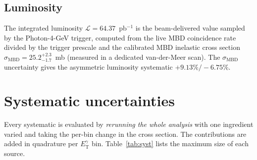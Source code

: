 \documentclass[11pt]{article}
\newcommand{\ETg}{E_{\mathrm{T}}^{\gamma}}
\begin{document}
\subsection{Luminosity}

The integrated luminosity $\mathcal{L}=64.37$~pb$^{-1}$ is the beam-delivered value sampled by the
Photon-4-GeV trigger, computed from the live MBD coincidence rate divided by the trigger prescale
and the calibrated MBD inelastic cross section
$\sigma_{\mathrm{MBD}}=25.2^{+2.3}_{-1.7}$~mb (measured in a dedicated van-der-Meer scan). The
$\sigma_{\mathrm{MBD}}$ uncertainty gives the asymmetric luminosity systematic
$+9.13\%/-6.75\%$.

\section{Systematic uncertainties}

Every systematic is evaluated by \emph{rerunning the whole analysis} with one ingredient varied and
taking the per-bin change in the cross section. The contributions are added in quadrature per
$\ETg$ bin. Table~\ref{tab:syst} lists the maximum size of each source.
\end{document}

